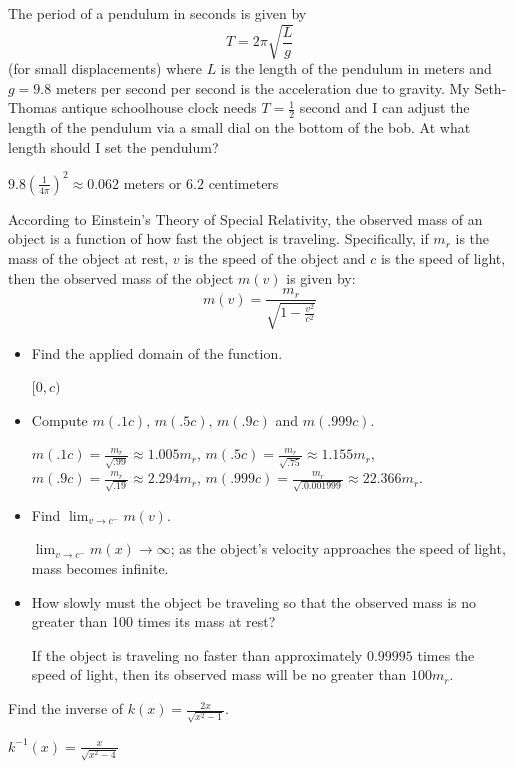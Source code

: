 \documentclass{ximera}
\begin{document}
\begin{problem}\label{pendulumproblem} The period of a pendulum in seconds is given by \[T = 2\pi \sqrt{\frac{L}{g}}\](for small displacements) where $L$ is the length of the pendulum in meters and $g = 9.8$ meters per second per second is the acceleration due to gravity.  My Seth-Thomas antique schoolhouse clock needs $T = \frac{1}{2}$ second and I can adjust the length of the pendulum via a small dial on the bottom of the bob.  At what length should I set the pendulum?

\begin{solution}
$9.8 \left(\frac{1}{4\pi}\right)^{2} \approx 0.062$ meters or $6.2$ centimeters
\end{solution}
\end{problem}

\begin{problem}
According to Einstein's Theory of Special Relativity, the observed mass  of an object is a function of how fast the object is traveling.  Specifically, if  $m_{r}$ is the mass of the object at rest, $v$ is the speed of the object and $c$ is the speed of light, then the observed mass of the object $m(v)$ is given by:
\[m(v) = \frac{m_{r}}{\sqrt{1 - \frac{v^{2}}{c^{2}}}}\]

\begin{itemize}
\item 
Find the applied domain of the function.

\begin{solution}
$[0, c)$
\end{solution}


\item
Compute $m(.1c), \, m(.5c), \, m(.9c)$ and $m(.999c)$.
\begin{solution}
$m(.1c) = \frac{m_{r}}{\sqrt{.99}} \approx 1.005m_{r}$,  $m(.5c) = \frac{m_{r}}{\sqrt{.75}} \approx 1.155m_{r}$,  $m(.9c) = \frac{m_{r}}{\sqrt{.19}} \approx 2.294m_{r}$, $m(.999c) = \frac{m_{r}}{\sqrt{.0.001999}} \approx 22.366m_{r}$.
\end{solution}

\item
Find $ \lim_{v \rightarrow c^{-}} m(v)$.
\begin{solution}
$ \lim_{v \rightarrow c^{-}} m(x) \rightarrow \infty$;   as the object's velocity approaches the speed of light, mass becomes infinite.
\end{solution}

\item
How slowly must the object be traveling so that the observed mass is no greater than 100 times its mass at rest?
\begin{solution}
If the object is traveling no faster than approximately $0.99995$ times the speed of light, then its observed mass will be no greater than $100m_{r}$.
\end{solution}

\end{itemize}
\end {problem}

\begin{problem}
Find the inverse of $k(x) = \frac{2x}{\sqrt{x^{2} - 1}}$.

\begin{solution}
$k^{-1}(x) = \frac{x}{\sqrt{x^{2} - 4}}$
\end{solution}
\end{problem}
\end{document}
